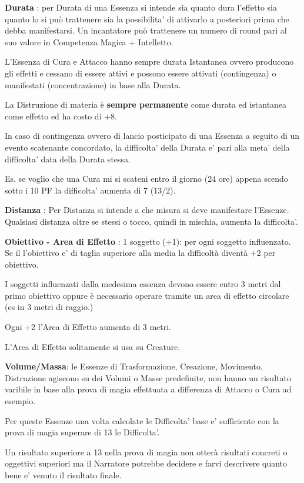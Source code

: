 \documentclass[a4paper,11pt,twoside,openany]{book}
\begin{document}
\textbf{Durata} : per Durata di una Essenza si intende sia quanto dura l'effetto sia quanto lo si può trattenere sia la possibilita' di attivarlo a posteriori prima che debba manifestarsi. Un incantatore può trattenere un numero di round pari al suo valore in Competenza Magica + Intelletto.

L'Essenza di Cura e Attacco hanno sempre durata Istantanea ovvero producono gli effetti e cessano di essere attivi e possono essere attivati (contingenza) o manifestati (concentrazione) in base alla Durata.

La Distruzione di materia è \textbf{sempre permanente} come durata ed istantanea come effetto ed ha costo di +8.

In caso di contingenza ovvero di lancio posticipato di una Essenza a seguito di un evento scatenante concordato, la difficolta' della Durata e' pari alla meta' della difficolta' data della Durata stessa.

Es. se voglio che una Cura mi si scateni entro il giorno (24 ore) appena scendo sotto i 10 PF la difficolta' aumenta di 7 (13/2).


\textbf{Distanza} : Per Distanza si intende a che misura si deve manifestare l'Essenze.
Qualsiasi distanza oltre se stessi o tocco, quindi in mischia, aumenta la difficolta'.


\textbf{Obiettivo - Area di Effetto} : 1 soggetto (+1): per ogni soggetto influenzato. Se il l'obiettivo e' di taglia superiore alla media la difficoltà diventà +2 per obiettivo.

I soggetti influenzati dalla medesima essenza devono essere entro 3 metri dal primo obiettivo oppure è necessario operare tramite un area di effetto circolare (es in 3 metri di raggio.)

Ogni +2 l'Area di Effetto aumenta di 3 metri.

L'Area di Effetto solitamente si usa su Creature.

\textbf{Volume/Massa}: le Essenze di Trasformazione, Creazione, Movimento, Distruzione agiscono su dei Volumi o Masse predefinite, non hanno un risultato varibile in base alla prova di magia effettuata a differenza di Attacco o Cura ad esempio.

Per queste Essenze una volta calcolate le Difficolta' base e' sufficiente con la prova di magia superare di 13 le Difficolta'.

Un risultato superiore a 13 nella prova di magia non otterà risultati concreti o oggettivi superiori ma il Narratore potrebbe decidere e farvi descrivere quanto bene e' venuto il risultato finale.
\end{document}
